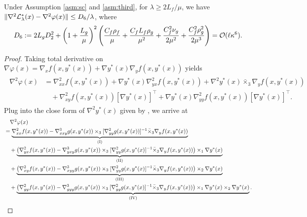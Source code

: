 \begin{lem} \label{lem:nabla2-phi}
Under Assumption \ref{asm:sc} and \ref{asm:third}, for $\lambda \ge 2 L_f /\mu$, we have $ \Vert \nabla^2 {\mathcal{L}}_{\lambda}^*(x) - \nabla^2 \varphi(x) \Vert \le  D_6 /\lambda$,
where
\begin{align*}
    D_6 := 2L_g D_2^2 + \left( 1 + \frac{L_g}{\mu}\right)^2\left( \frac{C_f \rho_f}{\mu} + \frac{C_f L_f \rho_g}{\mu^2} + \frac{C_f^2 \nu_g}{2 \mu^2} + \frac{C_f^2 \rho_g^2}{2 \mu^3}  \right)  = {\mathcal{O}}(\ell \kappa^6).
\end{align*}
\end{lem}

\begin{proof}
    Taking total derivative on $ \nabla \varphi(x) = \nabla_x f(x,y^*(x)) + \nabla y^*(x) \nabla_y f(x,y^*(x))$ yields
    \begin{align} \label{eq:phi-hess}
\begin{split}
    \nabla^2 \varphi(x) &= \nabla_{xx}^2 f(x,y^*(x)) + \nabla y^*(x) \nabla_{yx}^2 f(x,y^*(x))  + \nabla^2 y^*(x) \bar \times_3 \nabla_y f(x,y^*(x)) \\
    &\quad + \nabla_{xy}^2f(x,y^*(x)) [\nabla y^*(x)]^\top + \nabla y^*(x) \nabla_{yy}^2 f(x,y^*(x)) [\nabla y^*(x)]^\top.
\end{split}
\end{align}
Plug into the close form of $\nabla^2 y^*(x)$ given by , we arrive at
    \begin{align*}
    &\quad \nabla^2 \varphi(x) \\
    &= \underbrace{\nabla_{xx }^2  f(x,y^*(x)) - \nabla_{xxy}^3 g(x,y^*(x)) \times_3 [  \nabla_{yy}^2 g(x,y^*(x))]^{-1} \bar \times_3 \nabla_y f(x,y^*(x)) }_{\rm (I)} \\
    &\quad +  
    \underbrace{  \left(\nabla_{yx}^2 f(x,y^*(x)) - \nabla_{yxy}^3 g(x,y^*(x)) \times_3 [\nabla_{yy}^2 g(x,y^*(x)]^{-1}  \bar \times_3 \nabla_y f(x,y^*(x)) \right) \times_1 \nabla y^*(x)  }_{\rm (II)}  \\
    &\quad +  
    \underbrace{  \left(\nabla_{xy}^2 f(x,y^*(x)) - \nabla_{xyy}^3 g(x,y^*(x)) \times_3 [\nabla_{yy}^2 g(x,y^*(x)]^{-1}  \bar \times_3 \nabla_y f(x,y^*(x)) \right) \times_2 \nabla y^*(x)  }_{\rm (III)}  \\
    &\quad + \underbrace{  \left( \nabla_{yy}^2 f(x,y^*(x)) -  \nabla_{yyy}^3 g(x,y^*(x)) \times_3 [\nabla_{yy}^2 g(x,y^*(x)]^{-1} \bar \times_3 \nabla_y f(x,y^*(x))   \right) \times_1 \nabla y^*(x) \times_2 \nabla y^*(x) }_{\rm (IV)}. 
\end{align*}

\end{proof}
